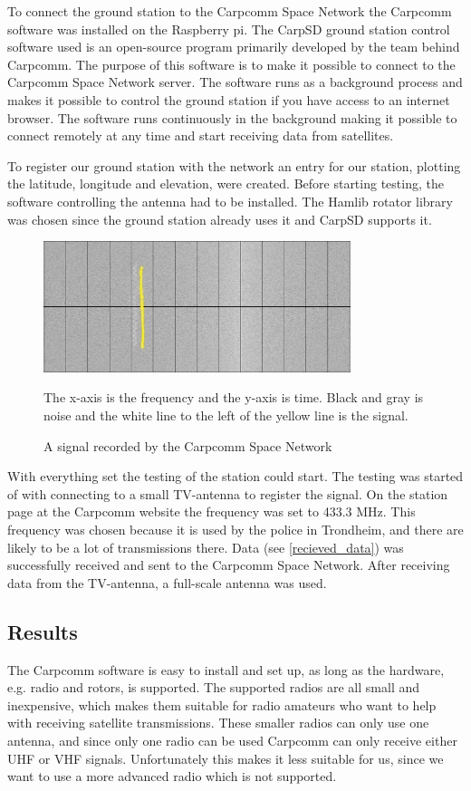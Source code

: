 To connect the ground station to the Carpcomm Space Network the Carpcomm software was installed on the Raspberry pi. The CarpSD ground station control software used is an open-source program primarily developed by the team behind Carpcomm. The purpose of this software is to make it possible to connect to the Carpcomm Space Network server. The software runs as a background process and makes it possible to control the ground station if you have access to an internet browser. The software runs continuously in the background making it possible to connect remotely at any time and start receiving data from satellites.

To register our ground station with the network an entry for our station, plotting the latitude, longitude and elevation, were created. 
Before starting testing, the software controlling the antenna had to be installed. The Hamlib rotator library was chosen since the ground station already uses it and CarpSD supports it. 

\begin{figure}
	\centering
	\includegraphics[width=0.8\textwidth]{Figures/sattelite_transmition}
	\caption{A signal recorded by the Carpcomm Space Network}
\label{recieved_data}
The x-axis is the frequency and the y-axis is time. Black and gray is noise and the white line to the left of the yellow line is the signal.
\end{figure}

With everything set the testing of the station could start. The testing was started of with connecting to a small TV-antenna to register the signal. On the station page at the Carpcomm website the frequency was set to 433.3 MHz. This frequency was chosen because it is used by the police in Trondheim, and there are likely to be a lot of transmissions there. Data (see \autoref{recieved_data}) was successfully received and sent to the Carpcomm Space Network. After receiving data from the TV-antenna, a full-scale antenna was used.

\subsection{Results}
The Carpcomm software is easy to install and set up, as long as the hardware, e.g. radio and rotors, is supported. The supported radios are all small and inexpensive, which makes them suitable for radio amateurs who want to help with receiving satellite transmissions. These smaller radios can only use one antenna, and since only one radio can be used Carpcomm can only receive either UHF or VHF signals. Unfortunately this makes it less suitable for us, since we want to use a more advanced radio which is not supported.


